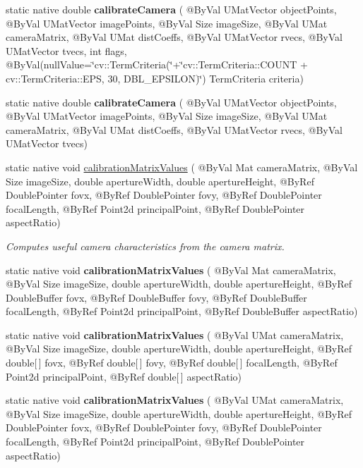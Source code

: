 \begin{DoxyCompactItemize}
\item 
static native double {\bfseries calibrate\+Camera} ( @By\+Val U\+Mat\+Vector object\+Points, @By\+Val U\+Mat\+Vector image\+Points, @By\+Val Size image\+Size, @By\+Val U\+Mat camera\+Matrix, @By\+Val U\+Mat dist\+Coeffs, @By\+Val U\+Mat\+Vector rvecs, @By\+Val U\+Mat\+Vector tvecs, int flags, @By\+Val(null\+Value=\char`\"{}cv\+::\+Term\+Criteria(\char`\"{}+\char`\"{}cv\+::\+Term\+Criteria\+::\+C\+O\+U\+NT + cv\+::\+Term\+Criteria\+::\+E\+PS, 30, D\+B\+L\+\_\+\+E\+P\+S\+I\+L\+ON)\char`\"{}) Term\+Criteria criteria)
\item 
static native double {\bfseries calibrate\+Camera} ( @By\+Val U\+Mat\+Vector object\+Points, @By\+Val U\+Mat\+Vector image\+Points, @By\+Val Size image\+Size, @By\+Val U\+Mat camera\+Matrix, @By\+Val U\+Mat dist\+Coeffs, @By\+Val U\+Mat\+Vector rvecs, @By\+Val U\+Mat\+Vector tvecs)
\item 
static native void \hyperlink{group__calib3d_ga35bea5b10b8dfd23238f72e9a2e2ac27}{calibration\+Matrix\+Values} ( @By\+Val Mat camera\+Matrix, @By\+Val Size image\+Size, double aperture\+Width, double aperture\+Height, @By\+Ref Double\+Pointer fovx, @By\+Ref Double\+Pointer fovy, @By\+Ref Double\+Pointer focal\+Length, @By\+Ref Point2d principal\+Point, @By\+Ref Double\+Pointer aspect\+Ratio)
\begin{DoxyCompactList}\small\item\em Computes useful camera characteristics from the camera matrix. \end{DoxyCompactList}\item 
static native void {\bfseries calibration\+Matrix\+Values} ( @By\+Val Mat camera\+Matrix, @By\+Val Size image\+Size, double aperture\+Width, double aperture\+Height, @By\+Ref Double\+Buffer fovx, @By\+Ref Double\+Buffer fovy, @By\+Ref Double\+Buffer focal\+Length, @By\+Ref Point2d principal\+Point, @By\+Ref Double\+Buffer aspect\+Ratio)
\item 
static native void {\bfseries calibration\+Matrix\+Values} ( @By\+Val U\+Mat camera\+Matrix, @By\+Val Size image\+Size, double aperture\+Width, double aperture\+Height, @By\+Ref double\mbox{[}$\,$\mbox{]} fovx, @By\+Ref double\mbox{[}$\,$\mbox{]} fovy, @By\+Ref double\mbox{[}$\,$\mbox{]} focal\+Length, @By\+Ref Point2d principal\+Point, @By\+Ref double\mbox{[}$\,$\mbox{]} aspect\+Ratio)
\item 
static native void {\bfseries calibration\+Matrix\+Values} ( @By\+Val U\+Mat camera\+Matrix, @By\+Val Size image\+Size, double aperture\+Width, double aperture\+Height, @By\+Ref Double\+Pointer fovx, @By\+Ref Double\+Pointer fovy, @By\+Ref Double\+Pointer focal\+Length, @By\+Ref Point2d principal\+Point, @By\+Ref Double\+Pointer aspect\+Ratio)

\end{DoxyCompactItemize}
